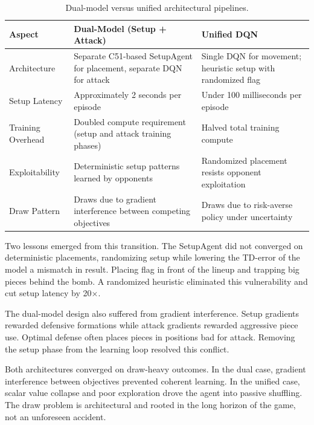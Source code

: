 \begin{table}[htbp]
    \centering
    \caption{Dual-model versus unified architectural pipelines.}
    \label{tab:architecture_comparison}
    \begin{tabular}{|p{3cm}|p{5.5cm}|p{5.5cm}|}
        \hline
        \textbf{Aspect} & \textbf{Dual-Model (Setup + Attack)} & \textbf{Unified DQN} \\
        \hline
        Architecture & Separate C51-based SetupAgent for placement, separate DQN for attack & Single DQN for movement; heuristic setup with randomized flag \\
        \hline
        Setup Latency & Approximately 2 seconds per episode & Under 100 milliseconds per episode \\
        \hline
        Training Overhead & Doubled compute requirement (setup and attack training phases) & Halved total training compute \\
        \hline
        Exploitability & Deterministic setup patterns learned by opponents & Randomized placement resists opponent exploitation \\
        \hline
        Draw Pattern & Draws due to gradient interference between competing objectives & Draws due to risk-averse policy under uncertainty \\
        \hline
    \end{tabular}
\end{table}

Two lessons emerged from this transition. The SetupAgent did not converged on deterministic placements, randomizing setup while lowering the TD-error of the model a mismatch in result. Placing flag in front of the lineup and trapping big pieces behind the bomb. A randomized heuristic eliminated this vulnerability and cut setup latency by 20$\times$.

The dual-model design also suffered from gradient interference. Setup gradients rewarded defensive formations while attack gradients rewarded aggressive piece use. Optimal defense often places pieces in positions bad for attack. Removing the setup phase from the learning loop resolved this conflict.

Both architectures converged on draw-heavy outcomes. In the dual case, gradient interference between objectives prevented coherent learning. In the unified case, scalar value collapse and poor exploration drove the agent into passive shuffling. The draw problem is architectural and rooted in the long horizon of the game, not an unforeseen accident.



